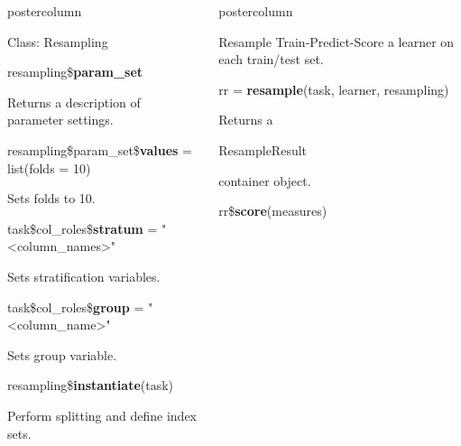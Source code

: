 \documentclass{beamer}
\newlength{\columnheight} %
\newcommand{\codeinline}[1]{\begin{codeboxinline}#1\end{codeboxinline}}
\begin{document}
\begin{withoutheader}
\begin{frame}[fragile]{}
\begin{columns}
\begin{column}{.245\textwidth}
\begin{beamercolorbox}[center]{postercolumn}
\begin{minipage}{.98\textwidth}
{\begin{myblock}{Class: Resampling}
\begin{itemize}
								\end{itemize}
								\vspace{1em}
								\begin{codebox}
									resampling\$\textbf{param\_set}
								\end{codebox}
								Returns a description of parameter settings.
								\\
								\begin{codebox}
									{\footnotesize resampling\$param\_set\$\textbf{values} = list(folds = 10)}
								\end{codebox}
								Sets folds to 10.
								\\
								\begin{codebox}
									task\$col\_roles\$\textbf{stratum} = "<column\_names>"
								\end{codebox}
								Sets stratification variables.
								\\
								\begin{codebox}
									task\$col\_roles\$\textbf{group} = "<column\_name>"
								\end{codebox}
								Sets group variable.
								\\
								\begin{codebox}
									resampling\$\textbf{instantiate}(task)
								\end{codebox}
								Perform splitting and define index sets.
							\end{myblock}
							\vfill}
					\end{minipage}
				\end{beamercolorbox}
			\end{column}
			\begin{column}{.245\textwidth}
				\begin{beamercolorbox}[center]{postercolumn}
					\begin{minipage}{.98\textwidth}
						\parbox[t][\columnheight]{\textwidth}{
							\begin{myblock}{Resample}
								Train-Predict-Score a learner on each train/test set.
								\\
								\begin{codebox}
									rr = \textbf{resample}(task, learner, resampling)
								\end{codebox}
								Returns a \codeinline{ResampleResult} container object.
								\\
								\begin{codebox}
									rr\$\textbf{score}(measures)
								\end{codebox}

\end{myblock}}
\end{minipage}
\end{beamercolorbox}
\end{column}
\end{columns}
\end{frame}
\end{withoutheader}
\end{document}
